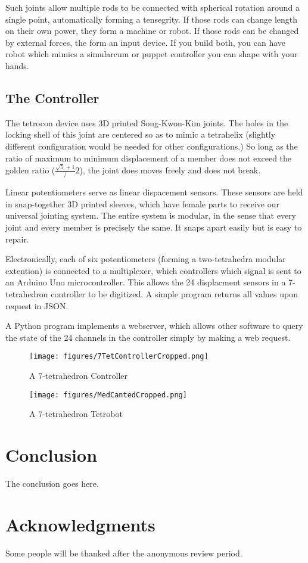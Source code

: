 \documentclass[conference]{IEEEtran}
\begin{document}
 Such joints allow multiple rods to be connected with spherical rotation
 around a single point, automatically forming a tensegrity.
 If those rods can change length on their own power, they form a
 machine or robot. If those rods can be changed by external forces,
 the form an input device.
 If you build both, you can have robot which mimics a simularcum or
 puppet controller you can shape with your hands.

 \subsection{The Controller}

 The tetrocon device uses 3D printed Song-Kwon-Kim joints. The holes in
 the locking shell of this joint are centered so as to mimic a tetrahelix
 (slightly different configuration would be needed for other configurations.)
 So long as the ratio of maximum to minimum displacement of a member does not
 exceed the golden ratio ($\frac{\sqrt{5} + 1}/2$), the joint does moves
 freely and does not break.

 Linear potentiometers serve as linear dispacement sensors.
 These sensors are held in snap-together 3D printed sleeves, which have
 female parts to receive our universal jointing system. The entire
 system is modular, in the sense that every joint and
 every member is precisely the same.
 It snaps apart easily but is easy to repair.

 Electronically, each of six potentiometers (forming a two-tetrahedra
 modular extention) is connected to a multiplexer, which controllers
 which signal is sent to an Arduino Uno microcontroller. This allows
 the 24 displacment sensors in a 7-tetrahedron controller to be
 digitized. A simple program returns all values upon request in
 JSON.

 A Python program implements a webserver, which allows other software
 to query the state of the 24 channels in the controller simply by
 making a web request.







\begin{figure}
  \centering
  \texttt{[image: figures/7TetControllerCropped.png]}
    \caption[A 7-tetrahedron Controller]{A 7-tetrahedron Controller}
      \label{fig:7tetcontroller}
\end{figure}

\begin{figure}
  \centering
  \texttt{[image: figures/MedCantedCropped.png]}
    \caption[A 7-tetrahedron Robot]{A 7-tetrahedron Tetrobot}
      \label{fig:7tetrobot}
\end{figure}



\section{Conclusion}
\label{sec:conclusion}

The conclusion goes here.

\section*{Acknowledgments}

Some people will be thanked after the anonymous review period.




\end{document}
